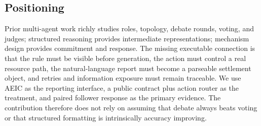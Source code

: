 \subsection{Positioning}
Prior multi-agent work richly studies roles, topology, debate rounds, voting, and judges; structured reasoning provides intermediate representations; mechanism design provides commitment and response. The missing executable connection is that the rule must be visible before generation, the action must control a real resource path, the natural-language report must become a parseable settlement object, and retries and information exposure must remain traceable. We use AEIC as the reporting interface, a public contract plus action router as the treatment, and paired follower response as the primary evidence. The contribution therefore does not rely on assuming that debate always beats voting or that structured formatting is intrinsically accuracy improving.
